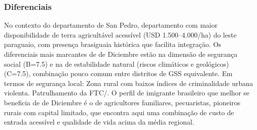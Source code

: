 \subsubsection*{Diferenciais}\label{dif-de-diciembre-0212}
No contexto do departamento de San Pedro, departamento com maior disponibilidade de terra agricultável acessível (USD 1.500–4.000/ha) do leste paraguaio, com presença brasiguaia histórica que facilita integração. Os diferenciais mais marcantes de de Diciembre estão na dimensão de segurança social (B=7.5) e na de estabilidade natural (riscos climáticos e geológicos) (C=7.5), combinação pouco comum entre distritos de GSS equivalente. Em termos de segurança local: Zona rural com baixos índices de criminalidade urbana violenta. Patrulhamento da FTC/. O perfil de imigrante brasileiro que melhor se beneficia de de Diciembre é o de agricultores familiares, pecuaristas, pioneiros rurais com capital limitado, que encontra aqui uma combinação de custo de entrada acessível e qualidade de vida acima da média regional.
